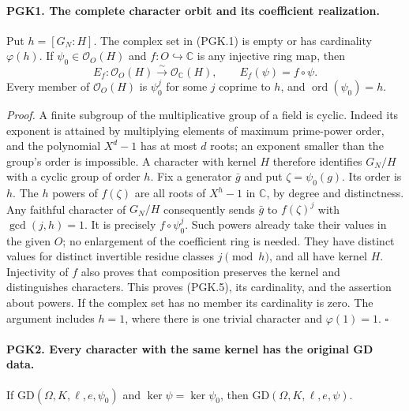 \documentclass[11pt,a4paper]{article}
\numberwithin{equation}{section}
\theoremstyle{remark}\newtheorem{remark}[theorem]{Remark}
\begin{document}
\paragraph{PGK1. The complete character orbit and its coefficient realization.}
\label{claim:PGK1}
Put \(h=[G_N:H]\). The complex set in (PGK.1) is empty or has
cardinality \(\varphi(h)\). If \(\psi_0\in\mathcal O_O(H)\) and
\(f:O\hookrightarrow\mathbb C\) is any injective ring map, then
\[
 E_f:\mathcal O_O(H)\overset\sim\longrightarrow
       \mathcal O_{\mathbb C}(H),\qquad
                     E_f(\psi)=f\circ\psi .                    \tag{PGK.5}
\]
Every member of \(\mathcal O_O(H)\) is \(\psi_0^j\) for some
\(j\) coprime to \(h\), and \(\operatorname{ord}(\psi_0)=h\).

\emph{Proof.}
A finite subgroup of the multiplicative group of a field is cyclic.
Indeed its exponent is attained by multiplying elements of maximum
prime-power order, and the polynomial \(X^d-1\) has at most \(d\)
roots; an exponent smaller than the group's order is impossible.
A character with kernel \(H\) therefore identifies \(G_N/H\)
with a cyclic group of order \(h\). Fix a generator \(\bar g\)
and put \(\zeta=\psi_0(g)\). Its order is \(h\).
The \(h\) powers of \(f(\zeta)\) are all roots of \(X^h-1\)
in \(\mathbb C\), by degree and distinctness. Any faithful
character of \(G_N/H\) consequently sends \(\bar g\) to
\(f(\zeta)^j\) with \(\gcd(j,h)=1\). It is precisely
\(f\circ\psi_0^j\). Such powers already take their values in
the given \(O\); no enlargement of the coefficient ring is needed.
They have distinct values for distinct invertible residue classes
\(j\pmod h\), and all have kernel \(H\).
Injectivity of \(f\) also proves that composition preserves the
kernel and distinguishes characters. This proves (PGK.5), its
cardinality, and the assertion about powers. If the complex set
has no member its cardinality is zero. The argument includes
\(h=1\), where there is one trivial character and
\(\varphi(1)=1\). \hfill\(\square\)

\paragraph{PGK2. Every character with the same kernel has the original GD data.}
\label{claim:PGK2}
If \(\mathrm{GD}(\Omega,K,\ell,e,\psi_0)\) and
\(\ker\psi=\ker\psi_0\), then
\(\mathrm{GD}(\Omega,K,\ell,e,\psi)\).
\end{document}
